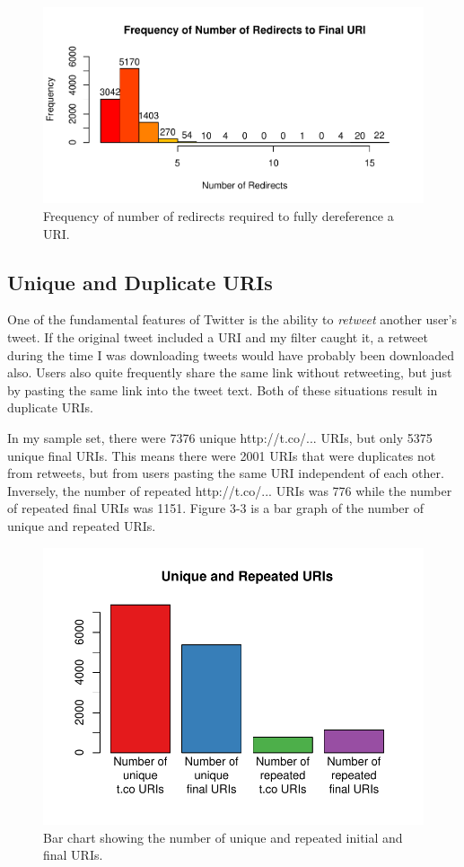 \documentclass[a4paper,12pt]{article}
\begin{document}
\begin{figure}[H]
    \centering
    \includegraphics{stats/num_redirects.pdf}
    \caption{Frequency of number of redirects required to fully dereference a URI.}
\end{figure}

\subsection{Unique and Duplicate URIs}
One of the fundamental features of Twitter is the ability to \emph{retweet} another user's tweet.
If the original tweet included a URI and my filter caught it, a retweet during the time I was
downloading tweets would have probably been downloaded also. Users also quite frequently share the
same link without retweeting, but just by pasting the same link into the tweet text. Both of these
situations result in duplicate URIs.

In my sample set, there were 7376 unique http://t.co/... URIs,
but only 5375 unique final URIs. This means there were 2001 URIs that were duplicates not from
retweets, but from users pasting the same URI independent of each other.  
Inversely, the number of repeated http://t.co/... URIs was 776 while the number of repeated final
URIs was 1151. Figure 3-3 is a bar graph of the number of unique and repeated URIs. 
\begin{figure}[H]
    \centering
    \includegraphics{stats/unique_and_dupe.pdf}
    \caption{Bar chart showing the number of unique and repeated initial and final URIs.}
\end{figure}
\end{document}
